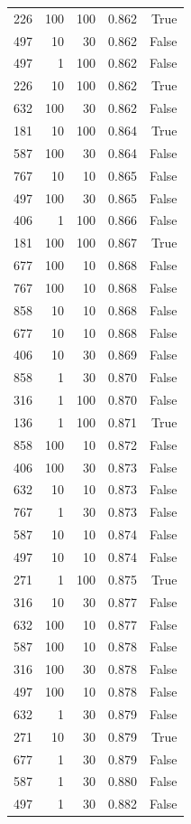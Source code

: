 \begin{tabular}{rrrrr}
226 & 100 & 100 & 0.862 & True \\
497 & 10 & 30 & 0.862 & False \\
497 & 1 & 100 & 0.862 & False \\
226 & 10 & 100 & 0.862 & True \\
632 & 100 & 30 & 0.862 & False \\
181 & 10 & 100 & 0.864 & True \\
587 & 100 & 30 & 0.864 & False \\
767 & 10 & 10 & 0.865 & False \\
497 & 100 & 30 & 0.865 & False \\
406 & 1 & 100 & 0.866 & False \\
181 & 100 & 100 & 0.867 & True \\
677 & 100 & 10 & 0.868 & False \\
767 & 100 & 10 & 0.868 & False \\
858 & 10 & 10 & 0.868 & False \\
677 & 10 & 10 & 0.868 & False \\
406 & 10 & 30 & 0.869 & False \\
858 & 1 & 30 & 0.870 & False \\
316 & 1 & 100 & 0.870 & False \\
136 & 1 & 100 & 0.871 & True \\
858 & 100 & 10 & 0.872 & False \\
406 & 100 & 30 & 0.873 & False \\
632 & 10 & 10 & 0.873 & False \\
767 & 1 & 30 & 0.873 & False \\
587 & 10 & 10 & 0.874 & False \\
497 & 10 & 10 & 0.874 & False \\
271 & 1 & 100 & 0.875 & True \\
316 & 10 & 30 & 0.877 & False \\
632 & 100 & 10 & 0.877 & False \\
587 & 100 & 10 & 0.878 & False \\
316 & 100 & 30 & 0.878 & False \\
497 & 100 & 10 & 0.878 & False \\
632 & 1 & 30 & 0.879 & False \\
271 & 10 & 30 & 0.879 & True \\
677 & 1 & 30 & 0.879 & False \\
587 & 1 & 30 & 0.880 & False \\
497 & 1 & 30 & 0.882 & False \\

\end{tabular}
